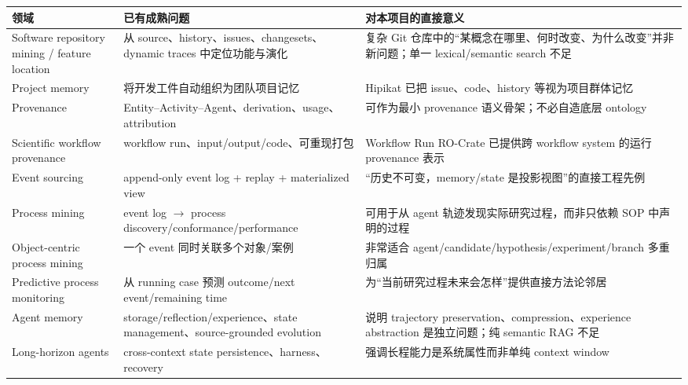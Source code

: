 \documentclass[11pt,a4paper]{ctexart}
\begin{document}
\begin{longtable}{p{}p{}p{}}
\toprule
领域 & 已有成熟问题 & 对本项目的直接意义\\
\midrule
Software repository mining / feature location & 从 source、history、issues、changesets、dynamic traces 中定位功能与演化 & 复杂 Git 仓库中的“某概念在哪里、何时改变、为什么改变”并非新问题；单一 lexical/semantic search 不足\parencite{dit2013feature,kagdi2007msr,chochlov2017historical}\\
Project memory & 将开发工件自动组织为团队项目记忆 & Hipikat 已把 issue、code、history 等视为项目群体记忆\parencite{cubranic2005hipikat}\\
Provenance & Entity--Activity--Agent、derivation、usage、attribution & 可作为最小 provenance 语义骨架；不必自造底层 ontology\parencite{w3cprov2013}\\
Scientific workflow provenance & workflow run、input/output/code、可重现打包 & Workflow Run RO-Crate 已提供跨 workflow system 的运行 provenance 表示\parencite{leo2024wfrun}\\
Event sourcing & append-only event log + replay + materialized view & “历史不可变，memory/state 是投影视图”的直接工程先例\parencite{fowler2005eventsourcing,santos2026esaa}\\
Process mining & event log $\to$ process discovery/conformance/performance & 可用于从 agent 轨迹发现实际研究过程，而非只依赖 SOP 中声明的过程\parencite{vanderAalst2016processmining,diba2021eventabstraction}\\
Object-centric process mining & 一个 event 同时关联多个对象/案例 & 非常适合 agent/\allowbreak candidate/\allowbreak hypothesis/\allowbreak experiment/\allowbreak branch 多重归属\parencite{berti2023ocpm,vanderAalst2026ocpm}\\
Predictive process monitoring & 从 running case 预测 outcome/next event/remaining time & 为“当前研究过程未来会怎样”提供直接方法论邻居\parencite{francescomarino2024ppm,verenich2019remaining}\\
Agent memory & storage/reflection/experience、state management、source-grounded evolution & 说明 trajectory preservation、compression、experience abstraction 是独立问题；纯 semantic RAG 不足\parencite{zhang2025memorysurvey,luo2026memorysurvey,chen2026mage,sun2026trajwiki}\\
Long-horizon agents & cross-context state persistence、harness、recovery & 强调长程能力是系统属性而非单纯 context window\parencite{dong2026longhorizon,wu2026reliable}\\

\end{longtable}
\end{document}
